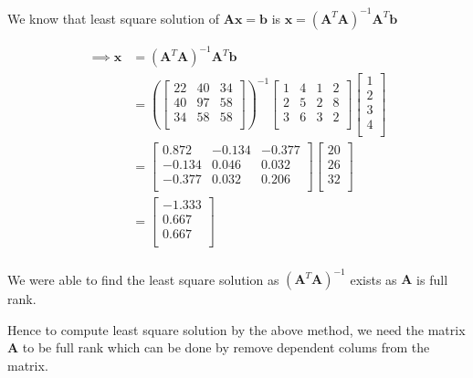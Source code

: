 \documentclass[12pt, letterpaper]{article}
\begin{document}
We know that least square solution of $\mathbf{Ax} = \mathbf{b}$ is
$\mathbf{x} = (\mathbf{A}^T\mathbf{A})^{-1}\mathbf{A}^T\mathbf{b}$

\begin{align*}
  \implies \mathbf{x} &= (\mathbf{A}^T\mathbf{A})^{-1}\mathbf{A}^T\mathbf{b}\\
  &= \left( \begin{bmatrix}
        22 & 40 & 34 \\
        40 & 97 & 58 \\
        34 & 58 & 58 \\
      \end{bmatrix} \right)^{-1}
    \begin{bmatrix}
      1 & 4 & 1 & 2 \\
      2 & 5 & 2 & 8 \\
      3 & 6 & 3 & 2 \\
    \end{bmatrix}
    \begin{bmatrix}
      1 \\
      2 \\
      3 \\
      4 \\
    \end{bmatrix}\\
  &= \begin{bmatrix}
        0.872 & -0.134 & -0.377 \\
        -0.134 & 0.046 & 0.032 \\
        -0.377 & 0.032 & 0.206 \\
      \end{bmatrix}
      \begin{bmatrix}
        20 \\
        26 \\
        32 \\
      \end{bmatrix}\\
  &= \begin{bmatrix}
        -1.333 \\
        0.667 \\
        0.667 \\
      \end{bmatrix}\\
\end{align*}

We were able to find the least square solution as $(\mathbf{A}^T\mathbf{A})^{-1}$ exists as $\mathbf{A}$ is full rank.

Hence to compute least square solution by the above method, we need the matrix $\mathbf{A}$ to be full rank which can be done by remove dependent colums from the matrix.
\end{document}
